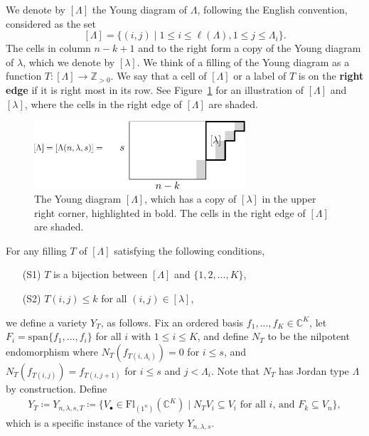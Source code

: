 \documentclass[12pt]{amsart}
\newcommand{\vspan}{\mathrm{span}}
\newcommand{\Fl}{\mathrm{Fl}}
\newcommand{\la}{\lambda}
\begin{document}
We denote by $[\Lambda]$ the Young diagram of $\Lambda$, following the English convention, considered as the set
$$[\Lambda]=\{(i,j)\mid 1\leq i\leq \ell(\Lambda), 1\leq j\leq \Lambda_i\}.$$
The cells in column $n-k+1$ and to the right form a copy of the Young diagram of $\lambda$, which we denote by $[\lambda]$. 
We think of a filling of the Young diagram as a function $T:[\Lambda]\rightarrow \mathbb{Z}_{>0}$.
We say that a cell of $[\Lambda]$ or a label of $T$ is on the \textbf{right edge} if it is right most in its row.
See Figure~\ref{fig:Lambda} for an illustration of $[\Lambda]$ and $[\lambda]$, where the cells in the right edge of $[\Lambda]$ are shaded. 

\begin{figure}
    \centering
    \includegraphics[width=0.7\textwidth]{LambdaExMain.eps}
    \caption{The Young diagram $[\Lambda]$, which has a copy of $[\lambda]$ in the upper right corner, highlighted in bold. The cells in the right edge of $[\Lambda]$ are shaded.
    }
    \label{fig:Lambda}
\end{figure}

For any filling $T$ of $[\Lambda]$ satisfying the following conditions,
\begin{enumerate}
\item[(S1)] $T$ is a bijection between $[\Lambda]$ and $\{1,2,\dots, K\}$,
\item[(S2)] $T(i,j)\leq k$ for all $(i,j)\in [\lambda]$,
\end{enumerate}
we define a variety $Y_{T}$, as follows.
Fix an ordered basis $f_1,\ldots,f_K\in \mathbb{C}^K$, let $F_i=\vspan\{f_1,\ldots,f_i\}$ for all $i$ with $1\leq i\leq K$, and  define $N_T$ to be the nilpotent endomorphism
where $N_T(f_{T(i,\Lambda_i)}) = 0$ for $i\leq s$, and  $N_T(f_{T(i,j)})=f_{T(i,j+1)}$ for $i\leq s$ and $j<\Lambda_i$.  Note that $N_T$ has Jordan type
$\Lambda$ by construction.  
Define
\begin{align}
    Y_T \coloneqq Y_{n,\lambda,s,T}\coloneqq \{V_\bullet\in\Fl_{(1^n)}(\mathbb{C}^K) \mid N_TV_i\subseteq V_i\text{ for all } i\text{, and } F_k\subseteq V_n\},
\end{align}
which is a specific instance of the variety $Y_{n,\la,s}$.
\end{document}
